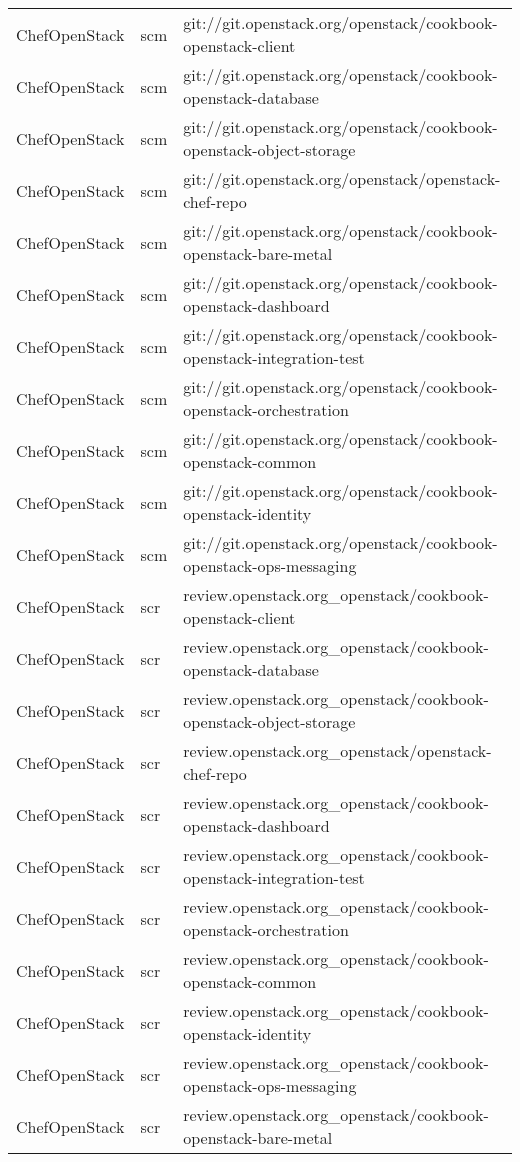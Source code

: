 \begin{center}
\begin{longtable}{|p{4cm}|p{1cm}|p{10cm}|}
ChefOpenStack&scm&git://git.openstack.org/openstack/cookbook-openstack-client\\ 
ChefOpenStack&scm&git://git.openstack.org/openstack/cookbook-openstack-database\\ 
ChefOpenStack&scm&git://git.openstack.org/openstack/cookbook-openstack-object-storage\\ 
ChefOpenStack&scm&git://git.openstack.org/openstack/openstack-chef-repo\\ 
ChefOpenStack&scm&git://git.openstack.org/openstack/cookbook-openstack-bare-metal\\ 
ChefOpenStack&scm&git://git.openstack.org/openstack/cookbook-openstack-dashboard\\ 
ChefOpenStack&scm&git://git.openstack.org/openstack/cookbook-openstack-integration-test\\ 
ChefOpenStack&scm&git://git.openstack.org/openstack/cookbook-openstack-orchestration\\ 
ChefOpenStack&scm&git://git.openstack.org/openstack/cookbook-openstack-common\\ 
ChefOpenStack&scm&git://git.openstack.org/openstack/cookbook-openstack-identity\\ 
ChefOpenStack&scm&git://git.openstack.org/openstack/cookbook-openstack-ops-messaging\\ 
ChefOpenStack&scr&review.openstack.org\_openstack/cookbook-openstack-client\\ 
ChefOpenStack&scr&review.openstack.org\_openstack/cookbook-openstack-database\\ 
ChefOpenStack&scr&review.openstack.org\_openstack/cookbook-openstack-object-storage\\ 
ChefOpenStack&scr&review.openstack.org\_openstack/openstack-chef-repo\\ 
ChefOpenStack&scr&review.openstack.org\_openstack/cookbook-openstack-dashboard\\ 
ChefOpenStack&scr&review.openstack.org\_openstack/cookbook-openstack-integration-test\\ 
ChefOpenStack&scr&review.openstack.org\_openstack/cookbook-openstack-orchestration\\ 
ChefOpenStack&scr&review.openstack.org\_openstack/cookbook-openstack-common\\ 
ChefOpenStack&scr&review.openstack.org\_openstack/cookbook-openstack-identity\\ 
ChefOpenStack&scr&review.openstack.org\_openstack/cookbook-openstack-ops-messaging\\ 
ChefOpenStack&scr&review.openstack.org\_openstack/cookbook-openstack-bare-metal\\ 

\end{longtable}
\end{center}
